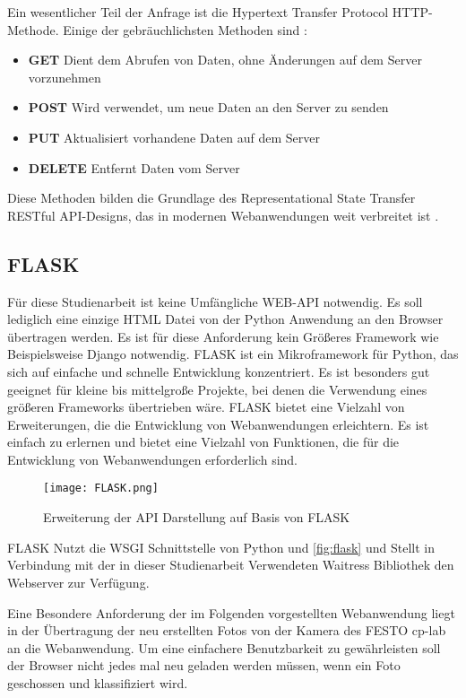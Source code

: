 Ein wesentlicher Teil der Anfrage ist die Hypertext Transfer Protocol \ac{HTTP}-Methode. Einige der gebräuchlichsten Methoden sind \cite{rodriguez_rest_2016}:
\begin{itemize}
    \item \textbf{GET} Dient dem Abrufen von Daten, ohne Änderungen auf dem Server vorzunehmen
    \item \textbf{POST} Wird verwendet, um neue Daten an den Server zu senden
    \item \textbf{PUT} Aktualisiert vorhandene Daten auf dem Server
    \item \textbf{DELETE} Entfernt Daten vom Server
\end{itemize}

Diese Methoden bilden die Grundlage des Representational State Transfer \ac{REST}ful API-Designs, das in modernen Webanwendungen weit verbreitet ist \cite{rodriguez_rest_2016}.

\subsection{FLASK} \label{subsec:flask}  %

Für diese Studienarbeit ist keine Umfängliche WEB-\ac{API} notwendig. Es soll lediglich eine einzige \ac{HTML} Datei von der Python Anwendung an den Browser übertragen werden. Es ist für diese Anforderung kein Größeres Framework wie Beispielsweise Django notwendig. FLASK ist ein Mikroframework für Python, das sich auf einfache und schnelle Entwicklung konzentriert. Es ist besonders gut geeignet für kleine bis mittelgroße Projekte, bei denen die Verwendung eines größeren Frameworks übertrieben wäre. FLASK bietet eine Vielzahl von Erweiterungen, die die Entwicklung von Webanwendungen erleichtern. Es ist einfach zu erlernen und bietet eine Vielzahl von Funktionen, die für die Entwicklung von Webanwendungen erforderlich sind.

\begin{figure}[h]
    \centering
    \texttt{[image: FLASK.png]}
    \caption{Erweiterung der API Darstellung auf Basis von FLASK}
    \label{fig:flask}
\end{figure}

FLASK Nutzt die \ac{WSGI} Schnittstelle von Python \cite{flask_welcome_nodate} und  \autoref{fig:flask} und Stellt in Verbindung mit der in dieser Studienarbeit Verwendeten Waitress Bibliothek den Webserver zur Verfügung.

Eine Besondere Anforderung der im Folgenden vorgestellten Webanwendung liegt in der Übertragung der neu erstellten Fotos von der Kamera des FESTO \ac{cp-lab} an die 
Webanwendung. Um eine einfachere Benutzbarkeit zu gewährleisten soll der Browser nicht jedes mal neu geladen werden müssen, wenn ein Foto geschossen und klassifiziert wird.

